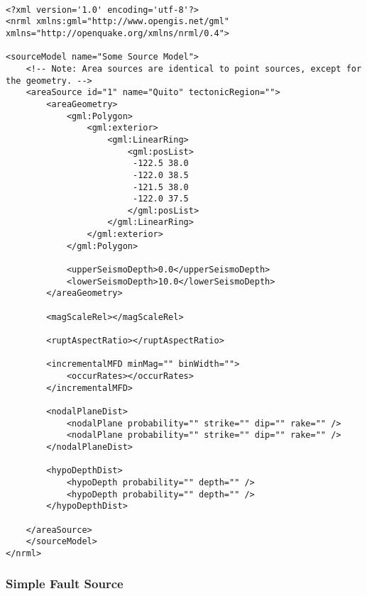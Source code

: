 \begin{Verbatim}[frame=single, commandchars=\\\{\}, fontsize=\scriptsize]

<?xml version='1.0' encoding='utf-8'?>
<nrml xmlns:gml="http://www.opengis.net/gml" xmlns="http://openquake.org/xmlns/nrml/0.4">

<sourceModel name="Some Source Model">
    <!-- Note: Area sources are identical to point sources, except for the geometry. -->
    <areaSource id="1" name="Quito" tectonicRegion="">
        <areaGeometry>
            <gml:Polygon>
                <gml:exterior>
                    <gml:LinearRing>
                        <gml:posList>
                         -122.5 38.0
                         -122.0 38.5
                         -121.5 38.0
                         -122.0 37.5
                        </gml:posList>
                    </gml:LinearRing>
                </gml:exterior>
            </gml:Polygon>

            <upperSeismoDepth>0.0</upperSeismoDepth>
            <lowerSeismoDepth>10.0</lowerSeismoDepth>
        </areaGeometry>

        <magScaleRel></magScaleRel>

        <ruptAspectRatio></ruptAspectRatio>

        <incrementalMFD minMag="" binWidth="">
            <occurRates></occurRates>
        </incrementalMFD>

        <nodalPlaneDist>
            <nodalPlane probability="" strike="" dip="" rake="" />
            <nodalPlane probability="" strike="" dip="" rake="" />
        </nodalPlaneDist>

        <hypoDepthDist>
            <hypoDepth probability="" depth="" />
            <hypoDepth probability="" depth="" />
        </hypoDepthDist>

    </areaSource>
    </sourceModel>
</nrml>

\end{Verbatim}

\subsubsection{Simple Fault Source}

